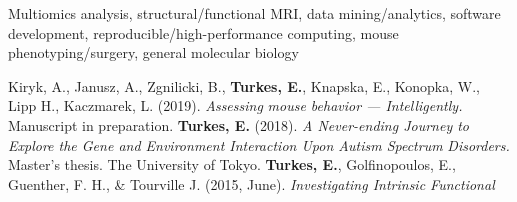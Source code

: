 %
%
%

\vspace*{-0.2cm}

\begin{cvskills}

    {Multiomics analysis, structural/functional MRI, data mining/analytics, software development, reproducible/high-performance computing, mouse phenotyping/surgery, general molecular biology}

    \vspace*{-0.1cm}
    {\small{Kiryk, A., Janusz, A., Zgnilicki, B., \textbf{Turkes, E.}, Knapska, E.,
        Konopka, W., Lipp H., Kaczmarek, L. (2019). \textit{Assessing}}
        \vspace*{-0.001cm}}
    \cvskill{}
    {\small{\hspace*{20pt}\textit{mouse behavior — Intelligently.} Manuscript in
        preparation.}}
    \vspace*{-0.1cm}
    \cvskill{}
    {\small{\textbf{Turkes, E.} (2018). \textit{A Never-ending Journey to Explore the
        Gene and Environment Interaction Upon Autism Spectrum}}\vspace*{-0.001cm}}
    \cvskill{}
    {\small{\hspace*{20pt}\textit{Disorders.} Master's thesis. The University of
        Tokyo.}}
    \vspace*{-0.1cm}
    \cvskill{}
    {\small{\textbf{Turkes, E.}, Golfinopoulos, E., Guenther, F. H., \& Tourville J.
        (2015, June). \textit{Investigating Intrinsic Functional}}}
    \cvskill{}
    {\small{}}

\vspace*{-1cm}
\end{cvskills}
